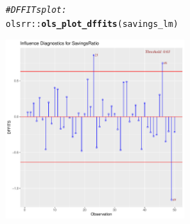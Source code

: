 \documentclass{article}\usepackage[]{graphicx}\usepackage[]{color}
\makeatletter
\newcommand{\hlcom}[1]{\textcolor[rgb]{0.678,0.584,0.686}{\textit{#1}}}%
\newcommand{\hlopt}[1]{\textcolor[rgb]{0,0,0}{#1}}%
\newcommand{\hlstd}[1]{\textcolor[rgb]{0.345,0.345,0.345}{#1}}%
\newcommand{\hlkwd}[1]{\textcolor[rgb]{0.737,0.353,0.396}{\textbf{#1}}}%
\newenvironment{kframe}{%
 \def\at@end@of@kframe{}%
 \ifinner\ifhmode%
  \def\at@end@of@kframe{\end{minipage}}%
  \begin{minipage}{\columnwidth}%
 \fi\fi%
 \def\FrameCommand##1{\hskip\@totalleftmargin \hskip-\fboxsep
 \colorbox{shadecolor}{##1}\hskip-\fboxsep
     \hskip-\linewidth \hskip-\@totalleftmargin \hskip\columnwidth}%
 \MakeFramed {\advance\hsize-\width
   \@totalleftmargin\z@ \linewidth\hsize
   \@setminipage}}%
 {\par\unskip\endMakeFramed%
 \at@end@of@kframe}
\newenvironment{knitrout}{}{} %
\makeatother
\begin{document}
\begin{knitrout}
\color{fgcolor}\begin{kframe}
\begin{alltt}
\hlcom{# DFFITs plot:}
\hlstd{olsrr}\hlopt{::}\hlkwd{ols_plot_dffits}\hlstd{(savings_lm)}
\end{alltt}
\end{kframe}

{\centering \includegraphics[width=0.5\textwidth]{figure/unnamed-chunk-4-1} 

}



\end{knitrout}
\end{document}
